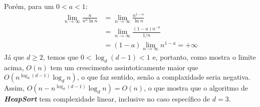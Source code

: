 Porém, para um $0 < a < 1$:
\begin{align*}
    \lim_{n\to\infty} \frac{n}{n^a\ln n}
    &= \lim_{n\to\infty} \frac{n^{1-a}}{\ln n} \\
    &= \lim_{n\to\infty} \frac{(1-a)n^{-a}}{1/n} \\
    &= (1-a) \lim_{n\to\infty} n^{1-a} = +\infty
\end{align*}
Já que $d \geqslant 2$, temos que $0 < \log_d (d-1) < 1$ e, portanto, como mostra o limite acima, $O(n)$ tem um
crescimento assintoticamente maior que $O(n^{\log_d (d-1)}\log_d n)$, o que faz sentido, senão a complaxidade seria negativa.
Assim, $O(n - n^{\log_d (d-1)}\log_d n) = O(n)$, o que mostra que o algoritmo de \textbf{\textit{HeapSort}}
tem complexidade linear, inclusive no caso específico de $d  = 3$.